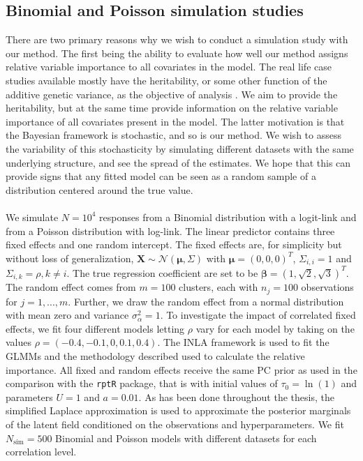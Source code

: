 \subsection{Binomial and Poisson simulation studies}
\label{sec:simulation_study}
There are two primary reasons why we wish to conduct a simulation study with our method. The first being the ability to evaluate how well our method assigns relative variable importance to all covariates in the model. The real life case studies available mostly have the heritability, or some other function of the additive genetic variance, as the objective of analysis \citep{Stensland_GMRF_bayes_animal_model}. We aim to provide the heritability, but at the same time provide information on the relative variable importance of all covariates present in the model. The latter motivation is that the Bayesian framework is stochastic, and so is our method. We wish to assess the variability of this stochasticity by simulating different datasets with the same underlying structure, and see the spread of the estimates. We hope that this can provide signs that any fitted model can be seen as a random sample of a distribution centered around the true value.
\\
\\
We simulate $N=10^4$ responses from a Binomial distribution with a logit-link and from a Poisson distribution with log-link. The linear predictor contains three fixed effects and one random intercept. The fixed effects are, for simplicity but without loss of generalization, $\mathbf{X} \sim \mathcal{N}(\boldsymbol{\mu}, \Sigma)$ with $\boldsymbol{\mu} = (0, 0, 0)^T$, $\Sigma_{i, i} = 1$ and $\Sigma_{i, k} = \rho, k \neq i$. The true regression coefficient are set to be $\boldsymbol{\beta}=(1, \sqrt{2}, \sqrt{3})^T$. The random effect comes from $m=100$ clusters, each with $n_j=100$ observations for $j=1, ..., m$. Further, we draw the random effect from a normal distribution with mean zero and variance $\sigma^2_{\alpha} = 1$. To investigate the impact of correlated fixed effects, we fit four different models letting $\rho$ vary for each model by taking on the values $\rho=(-0.4, -0.1, 0, 0.1, 0.4)$. The INLA framework is used to fit the GLMMs and the methodology described used to calculate the relative importance. All fixed and random effects receive the same PC prior as used in the comparison with the \texttt{rptR} package, that is with initial values of $\tau_0=\ln(1)$ and parameters $U=1$ and $a=0.01$. As has been done throughout the thesis, the simplified Laplace approximation is used to approximate the posterior marginals of the latent field conditioned on the observations and hyperparameters. We fit $N_{\text{sim}}=500$ Binomial and Poisson models with different datasets for each correlation level.
